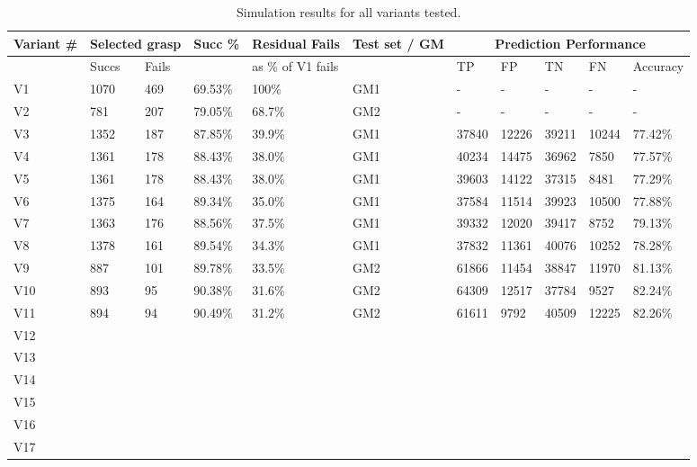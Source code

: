 \begin{table}[t]
\centering
\begin{tabular}{|l|l|l|l|l|l|l|l|l|l|l|}
\hline
Variant \# & \multicolumn{2}{|c|}{Selected grasp} &  Succ \% & Residual Fails & Test set / GM& \multicolumn{5}{|c|}{Prediction Performance} \\ \hline
 & Succs & Fails &  & as \% of V1 fails &  & TP & FP & TN & FN & Accuracy \\ \hline
V1 & 1070   & 469 & 69.53\% & 100\% & GM1 & - & - & - & - & - \\ \hline
V2 &  781   & 207 & 79.05\% & 68.7\% & GM2 & - & - & - & - & - \\ \hline
V3 & 1352 & 187 & 87.85\% & 39.9\% & GM1 & 37840 &	12226 & 39211 & 10244 & 77.42\% \\ \hline
V4 &  1361 & 178 & 88.43\% & 38.0\% & GM1 & 40234 &	14475 & 36962 & 7850 & 77.57\% \\ \hline

V5 & 1361 & 178 & 88.43\% & 38.0\%& GM1 & 39603 & 14122 &37315 & 8481	& 77.29\% \\ \hline

V6 & 1375 & 164 & 89.34\% & 35.0\% & GM1 & 37584 &	11514 & 39923 &10500	& 77.88\% \\ \hline
V7 & 1363 & 176 & 88.56\% & 37.5\% & GM1 & 39332 &	12020 & 39417 & 8752 & 79.13\% \\ \hline
V8 & 1378 & 161 & 89.54\% & 34.3\% & GM1 & 37832 &	11361 & 40076	& 10252 & 78.28\% \\ \hline
V9 & 887 & 101 & 89.78\% & 33.5\% & GM2 & 61866 &	11454& 38847& 11970 & 81.13\% \\ \hline
V10 & 893 & 95 & 90.38\% & 31.6\% & GM2 & 64309 &	12517 & 37784 & 9527 & 82.24\% \\ \hline
V11 & 894 & 94 & 90.49\% & 31.2\% & GM2 & 61611 & 9792 & 40509 & 12225 & 82.26\% \\ \hline
V12 & & & & & & & & & & \\ \hline
V13 & & & & & & & & & & \\ \hline
V14 & & & & & & & & & & \\ \hline
V15 & & & & & & & & & & \\ \hline
V16 & & & & & & & & & & \\ \hline
V17 & & & & & & & & & & \\ \hline
\end{tabular}
\caption{Simulation results for all variants tested.}
\label{table:Results-sim}
\end{table}
